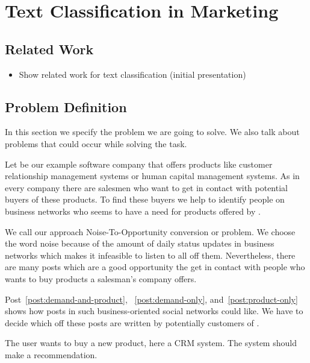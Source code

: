 
\section{Text Classification in Marketing}
\label{sec:background}

\subsection{Related Work}

\begin{itemize}
	\item Show related work for text classification (initial presentation)
\end{itemize}

\subsection{Problem Definition}
\label{sec:background-problem}

In this section we specify the problem we are going to solve. We also talk about problems that could occur while solving the task. 

Let \acme be our example software company that offers products like customer relationship management systems or human capital management systems. 
As in every company there are salesmen who want to get in contact with potential buyers of these products. 
To find these buyers we help \acme to identify people on business networks who seems to have a need for products offered by \acme.

We call our approach Noise-To-Opportunity conversion or \nto problem.
We choose the word noise because of the amount of daily status updates in business networks which makes it infeasible to listen to all off them.
Nevertheless, there are many posts which are a good opportunity the get in contact with people who wants to buy products a salesman's company offers. 

Post~\ref{post:demand-and-product}, ~\ref{post:demand-only}, and~\ref{post:product-only} shows how posts in such business-oriented social networks could like. 
We have to decide which off these posts are written by potentially customers of \acme. 

\begin{post}
	\centering
	\caption{The user wants to buy a new product, here a CRM system. The system should make a recommendation.}
	\label{post:demand-and-product}
\end{post}

